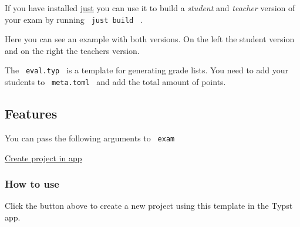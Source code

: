 If you have installed \href{https://just.systems/}{just} you can use it
to build a \emph{student} and \emph{teacher} version of your exam by
running \texttt{\ just\ build\ } .

Here you can see an example with both versions. On the left the student
version and on the right the teachers version.


The \texttt{\ eval.typ\ } is a template for generating grade lists. You
need to add your students to \texttt{\ meta.toml\ } and add the total
amount of points.

\subsection{Features}\label{features}

You can pass the following arguments to \texttt{\ exam\ }

\begin{Shaded}
\begin{Highlighting}[]
\NormalTok{)}
\end{Highlighting}
\end{Shaded}

\href{/app?template=ttt-exam&version=0.1.2}{Create project in app}

\subsubsection{How to use}\label{how-to-use}

Click the button above to create a new project using this template in
the Typst app.

